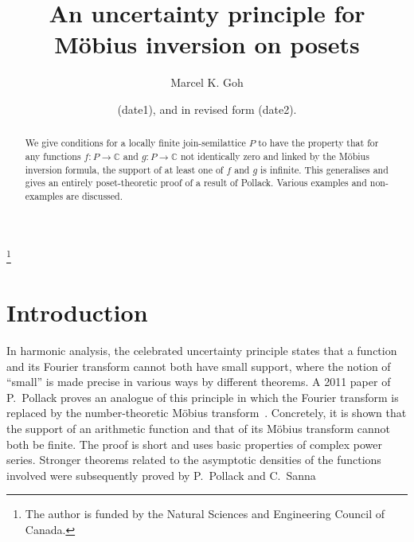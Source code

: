 \documentclass[11pt]{amsart}
\theoremstyle{myexample}
\theoremstyle{myremark}
\theoremstyle{conjecture}
\numberwithin{equation}{section}
\def\CC{\mathbb{C}}
\begin{document}
\title{An uncertainty principle for M\"obius inversion on posets}

\author{Marcel K. Goh}
\address{Department of Mathematics and Statistics, McGill University, Montr\'eal, Qu\'ebec, Canada}

%

\date{(date1), and in revised form (date2).}

\thanks{The author is funded by the Natural Sciences and Engineering Council of Canada.}

\begin{abstract}
We give conditions for a locally finite join-semilattice $P$ to have the property that
for any functions $f:P\to \CC$ and $g:P\to \CC$ not identically zero and
linked by the M\"obius inversion formula, the support of at
least one of $f$ and $g$ is infinite. This generalises
and gives an entirely poset-theoretic proof of a result of Pollack. Various examples and non-examples
are discussed.
\end{abstract}

\maketitle

\section{Introduction}

In harmonic analysis,
the celebrated uncertainty principle states that a function and its Fourier
transform cannot both have small support, where the notion of ``small'' is made precise in various ways
by different theorems.
A 2011 paper of P.~Pollack proves an analogue of this principle in which the Fourier
transform
is replaced by the number-theoretic M\"obius transform~\cite{pollack2011}.
Concretely, it is shown that the support of an arithmetic function
and that of its M\"obius transform cannot both be finite. The proof is short and uses basic properties of
complex power series. Stronger theorems related to the asymptotic densities of the functions involved
were subsequently proved by P.~Pollack and C.~Sanna~\cite{pollacksanna}
\end{document}
